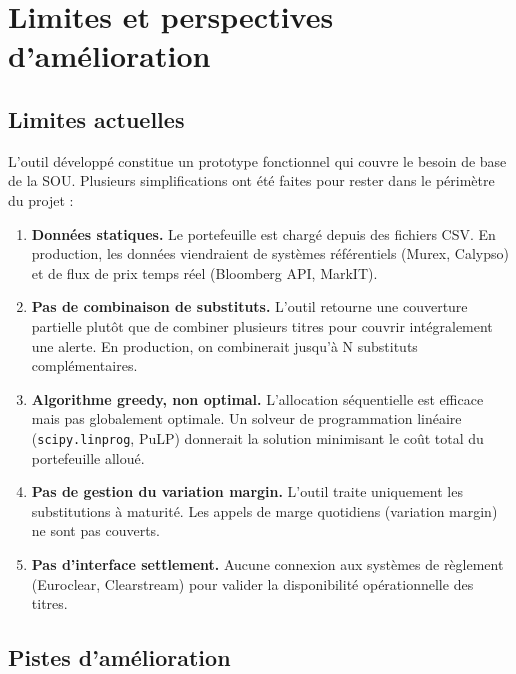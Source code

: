 \documentclass[12pt,a4paper]{article}
\begin{document}
\newpage
\section{Limites et perspectives d'amélioration}

\subsection{Limites actuelles}

L'outil développé constitue un prototype fonctionnel qui couvre le besoin de base
de la SOU. Plusieurs simplifications ont été faites pour rester dans le périmètre
du projet :

\begin{enumerate}[leftmargin=*]
  \item \textbf{Données statiques.} Le portefeuille est chargé depuis des fichiers CSV.
    En production, les données viendraient de systèmes référentiels (Murex, Calypso)
    et de flux de prix temps réel (Bloomberg API, MarkIT).
  \item \textbf{Pas de combinaison de substituts.} L'outil retourne une couverture
    partielle plutôt que de combiner plusieurs titres pour couvrir intégralement une
    alerte. En production, on combinerait jusqu'à N substituts complémentaires.
  \item \textbf{Algorithme greedy, non optimal.} L'allocation séquentielle est
    efficace mais pas globalement optimale. Un solveur de programmation linéaire
    (\texttt{scipy.linprog}, PuLP) donnerait la solution minimisant le coût total
    du portefeuille alloué.
  \item \textbf{Pas de gestion du variation margin.} L'outil traite uniquement les
    substitutions à maturité. Les appels de marge quotidiens (variation margin) ne
    sont pas couverts.
  \item \textbf{Pas d'interface settlement.} Aucune connexion aux systèmes de règlement
    (Euroclear, Clearstream) pour valider la disponibilité opérationnelle des titres.
\end{enumerate}

\subsection{Pistes d'amélioration}
\end{document}
